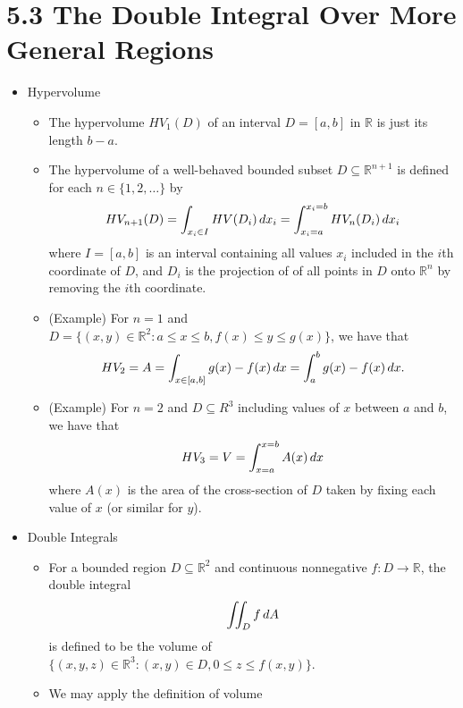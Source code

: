 \documentclass[11pt]{article}
\begin{document}
\section*{5.3 The Double Integral Over More General Regions}
\begin{itemize}
  \item Hypervolume
    \begin{itemize}
      \item The hypervolume \(HV_1(D)\)
      of an interval \(D=[a,b]\) in \(\mathbb R\) is just its length \(b-a\).
      \item The hypervolume of a well-behaved bounded subset
      \(D\subseteq\mathbb R^{n+1}\) is defined for each
      \(n\in\{1,2,\dots\}\) by
        \[
          HV_{n+1}(D)
            =
          \int_{x_i\in I}
          HV(D_i)
          \,d{x_i}
            =
          \int_{x_i=a}^{x_i=b}
          HV_n(D_i)
          \,d{x_i}
        \]
      where \(I=[a,b]\) is an interval containing all values \(x_i\) included
      in the \(i\)th coordinate of \(D\), and \(D_i\) is the projection of
      of all points in \(D\) onto \(\mathbb R^n\) by removing the \(i\)th
      coordinate.
      \item (Example) For \(n=1\) and
      \(D=\{(x,y)\in\mathbb R^2:a\leq x\leq b,f(x)\leq y\leq g(x)\}\), we
      have that
        \[
          HV_2
            =
          A
            =
          \int_{x\in[a,b]}
          g(x)-f(x)
          \,d{x}
            =
          \int_a^b
          g(x)-f(x)
          \,d{x}
        .\]
      \item (Example) For \(n=2\) and \(D\subseteq R^3\) including values
      of \(x\) between \(a\) and \(b\), we have that
        \[
          HV_3
            =
          V
            =
          \int_{x=a}^{x=b}
          A(x)
          \,d{x}
        \]
      where \(A(x)\) is the area of the cross-section of \(D\) taken by fixing
      each value of \(x\) (or similar for \(y\)).
    \end{itemize}
  \item Double Integrals
    \begin{itemize}
      \item
      For a bounded region \(D\subseteq\mathbb R^2\) and continuous
      nonnegative
      \(f:D\to\mathbb R\), the double integral
        \[
          \iint_D f\,d A
        \]
      is defined to be the volume of
      \(\{(x,y,z)\in\mathbb R^3:(x,y)\in D,0\leq z\leq f(x,y)\}\).
      \item We may apply the definition of volume

\end{itemize}
\end{itemize}
\end{document}
